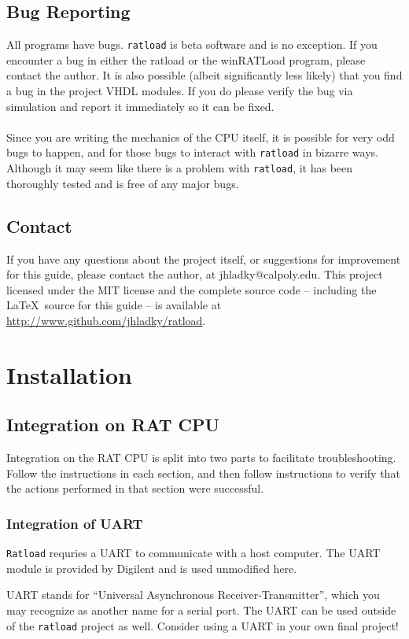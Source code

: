 \documentclass[notitlepage]{article}
\newcommand{\infosign}{\fontencoding{U}\fontfamily{futs}\huge\selectfont\char 116\relax}
\begin{document}
\subsection{Bug Reporting}
All programs have bugs. \texttt{ratload} is beta software and is no exception. If you encounter a bug in either the ratload or the winRATLoad program, please contact the author. It is also possible (albeit significantly less likely) that you find a bug in the project VHDL modules. If you do please verify the bug via simulation and report it immediately so it can be fixed.\\\\
Since you are writing the mechanics of the CPU itself, it is possible for very odd bugs to happen, and for those bugs to interact with \texttt{ratload} in bizarre ways. Although it may seem like there is a problem with \texttt{ratload}, it has been thoroughly tested and is free of any major bugs.

\subsection{Contact}
If you have any questions about the project itself, or suggestions for improvement for this guide, please contact the author, at jhladky@calpoly.edu. This project licensed under the MIT license and the complete source code -- including the \LaTeX ~source for this guide -- is available at \url{http://www.github.com/jhladky/ratload}.


\section{Installation}
\subsection{Integration on RAT CPU}
Integration on the RAT CPU is split into two parts to facilitate troubleshooting. Follow the instructions in each section, and then follow instructions to verify that the actions performed in that section were successful.

\subsubsection{Integration of UART}
\texttt{Ratload} requries a UART to communicate with a host computer. The UART module is provided by Digilent and is used unmodified here.
\begin{infobox}
  {\infosign} UART stands for ``Universal Asynchronous Receiver-Transmitter'', which you may recognize as another name for a serial port. The UART can be used outside of the \texttt{ratload} project as well. Consider using a UART in your own final project!
\end{infobox}
\end{document}

